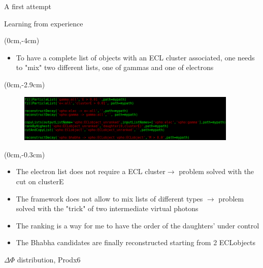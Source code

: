 \documentclass[10pt]{beamer}
\begin{document}
{\begin{frame}{A first attempt}
	
\end{frame}




\begin{frame}{Learning from experience}
	\begin{textblock*}{\textwidth}(0cm,-4cm)
	
		\begin{itemize}
			
		\item To have a complete list of objects with an ECL cluster associated, one needs to "mix" two different lists, one of gammas and one of electrons
	
	\end{itemize}
	
\end{textblock*}
	\begin{textblock*}{\textwidth}(0cm,-2.9cm)
		
	
	\begin{figure}
		\includegraphics[width=10.5cm]{Plots/newSc}
	\end{figure}

\end{textblock*}
	
	
	\begin{textblock*}{\textwidth}(0cm,-0.3cm)
		

	\begin{itemize}
	\item The electron list does not require a ECL cluster$\rightarrow$ problem solved with the cut on clusterE
	\item The framework does not allow to mix lists of different types $\rightarrow$ problem solved with the "trick" of two intermediate virtual photons
	\item The ranking is a way for me to have the order of the daughters' under control
	\item The Bhabha candidates are finally reconstructed starting from 2 ECLobjects
\end{itemize}
	\end{textblock*}
\end{frame}



\begin{frame}{$\Delta \Phi$ distribution, Prodx6}



\end{frame}}
\end{document}
